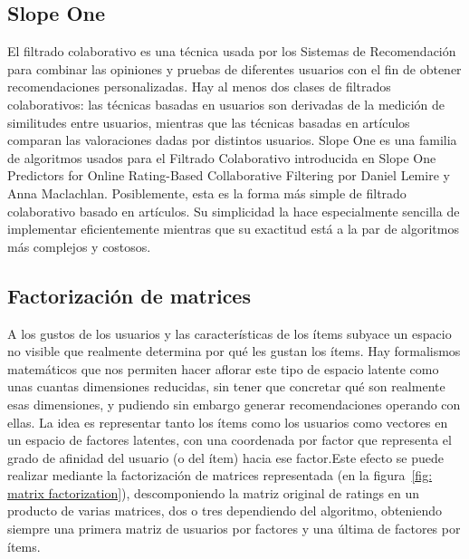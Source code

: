 \subsection{Slope One}
El filtrado colaborativo es una técnica usada por los Sistemas de Recomendación para combinar las opiniones y pruebas de diferentes usuarios con el fin de obtener recomendaciones personalizadas. Hay al menos dos clases de filtrados colaborativos: las técnicas basadas en usuarios son derivadas de la medición de similitudes entre usuarios, mientras que las técnicas basadas en artículos comparan las valoraciones dadas por distintos usuarios. Slope One es una familia de algoritmos usados para el Filtrado Colaborativo introducida en Slope One Predictors for Online Rating-Based Collaborative Filtering por Daniel Lemire y Anna Maclachlan. Posiblemente, esta es la forma más simple de filtrado colaborativo basado en artículos. Su simplicidad la hace especialmente sencilla de implementar eficientemente mientras que su exactitud está a la par de algoritmos más complejos y costosos.\cite{11}
 	
\subsection{Factorización de matrices}
A los gustos de los usuarios y las características de los ítems subyace un espacio no visible que realmente determina por qué les gustan los ítems. Hay formalismos matemáticos que nos permiten hacer aflorar este tipo de espacio latente como unas cuantas dimensiones reducidas, sin tener que concretar qué son realmente esas dimensiones, y pudiendo sin embargo generar recomendaciones operando con ellas. La idea es representar tanto los ítems como los usuarios como vectores en un espacio de factores latentes, con una coordenada por factor que representa el grado de afinidad del usuario (o del ítem) hacia ese factor.Este efecto se puede realizar mediante la factorización de matrices representada (en la figura~\ref{fig: matrix factorization}), descomponiendo la matriz original de ratings en un producto de varias matrices, dos o tres dependiendo del algoritmo, obteniendo siempre una primera matriz de usuarios por factores y una última de factores por ítems.\cite{12}

